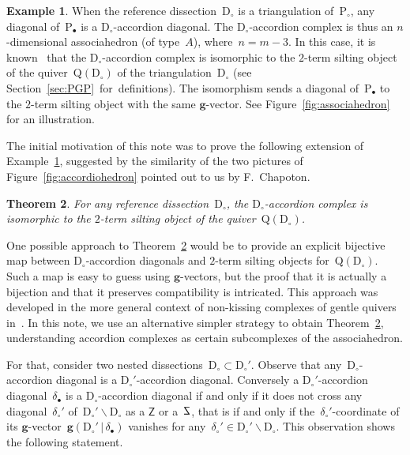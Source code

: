 \documentclass{amsart}
\newtheorem{theorem}{Theorem}%
\theoremstyle{definition}
\newtheorem{example}[theorem]{Example}
\renewcommand{\b}[1]{\mathbf{#1}} %
\newcommand{\ssm}{\smallsetminus} %
\newcommand{\fref}[1]{Figure~\ref{#1}} %
\newcommand{\polygon}{\mathrm{P}} %
\newcommand{\dissection}{\mathrm{D}} %
\newcommand{\SSS}{\reflectbox{$\mathsf{Z}$}} %
\newcommand{\ZZZ}{\mathsf{Z}} %
\newcommand{\gvector}[2]{\mathbf{g}(#1 \,|\, #2)} %
\newcommand{\quiver}{\mathrm{Q}} %
\begin{document}
\begin{example}
\label{exm:associahedron}
When the reference dissection~$\dissection_\circ$ is a triangulation of~$\polygon_\circ$, any diagonal of~$\polygon_\bullet$ is a $\dissection_\circ$-accordion diagonal.
The $\dissection_\circ$-accordion complex is thus an $n$-dimensional associahedron (of type~$A$), where~$n = m-3$.
In this case, it is known~\cite{??} that the $\dissection_\circ$-accordion complex is isomorphic to the $2$-term silting object of the quiver~$\quiver(\dissection_\circ)$ of the triangulation~$\dissection_\circ$ (see Section~\ref{sec:PGP}~for~definitions).
The isomorphism sends a diagonal of~$\polygon_\bullet$ to the $2$-term silting object with the same $\b{g}$-vector.
See \fref{fig:associahedron} for an illustration.
\end{example}

The initial motivation of this note was to prove the following extension of Example~\ref{exm:associahedron}, suggested by the similarity of the two pictures of \fref{fig:accordiohedron} pointed out to us by F.~Chapoton.

\begin{theorem}
\label{thm:bijectionAccordionComplexSiltingComplex}
For any reference dissection~$\dissection_\circ$, the $\dissection_\circ$-accordion complex is isomorphic to the $2$-term silting object of the quiver~$\quiver(\dissection_\circ)$.
\end{theorem}

One possible approach to Theorem~\ref{thm:bijectionAccordionComplexSiltingComplex} would be to provide an explicit bijective map between $\dissection_\circ$-accordion diagonals and $2$-term silting objects for~$\quiver(\dissection_\circ)$.
Such a map is easy to guess using $\b{g}$-vectors, but the proof that it is actually a bijection and that it preserves compatibility is intricated.
This approach was developed in the more general context of non-kissing complexes of gentle quivers in~\cite{PaluPilaudPlamondon}.
In this note, we use an alternative simpler strategy to obtain Theorem~\ref{thm:bijectionAccordionComplexSiltingComplex}, understanding accordion complexes as certain subcomplexes of the associahedron.

For that, consider two nested dissections~$\dissection_\circ \subset \dissection_\circ'$.
Observe that any~$\dissection_\circ$-accordion diagonal is a $\dissection_\circ'$-accordion diagonal.
Conversely a $\dissection_\circ'$-accordion diagonal~$\delta_\bullet$ is a $\dissection_\circ$-accordion diagonal if and only if it does not cross any diagonal~$\delta_\circ'$ of~$\dissection_\circ' \ssm \dissection_\circ$ as a $\ZZZ$ or a~$\SSS$, that is if and only if the~$\delta_\circ'$-coordinate of its $\b{g}$-vector~$\gvector{\dissection_\circ'}{\delta_\bullet}$ vanishes for any~$\delta_\circ' \in \dissection_\circ' \ssm \dissection_\circ$.
This observation shows the following statement.
\end{document}
